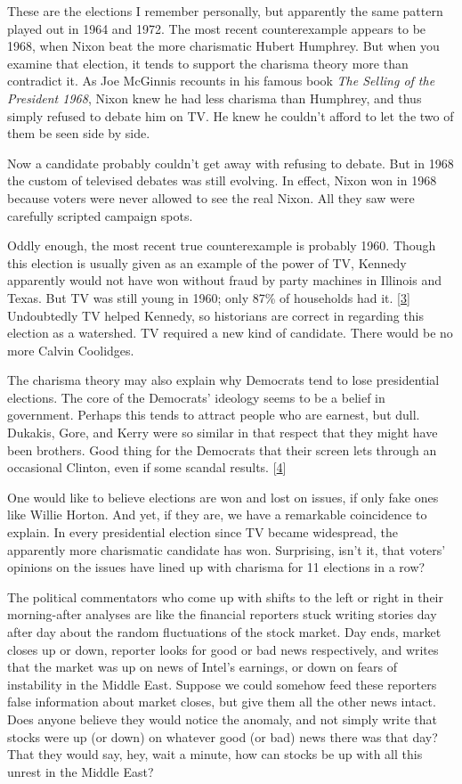 These are the elections I remember personally, but apparently the same
pattern played out in 1964 and 1972. The most recent counterexample
appears to be 1968, when Nixon beat the more charismatic Hubert
Humphrey. But when you examine that election, it tends to support the
charisma theory more than contradict it. As Joe McGinnis recounts in his
famous book \emph{The Selling of the President 1968}, Nixon knew he had
less charisma than Humphrey, and thus simply refused to debate him on
TV. He knew he couldn't afford to let the two of them be seen side by
side.

Now a candidate probably couldn't get away with refusing to debate. But
in 1968 the custom of televised debates was still evolving. In effect,
Nixon won in 1968 because voters were never allowed to see the real
Nixon. All they saw were carefully scripted campaign spots.

Oddly enough, the most recent true counterexample is probably 1960.
Though this election is usually given as an example of the power of TV,
Kennedy apparently would not have won without fraud by party machines in
Illinois and Texas. But TV was still young in 1960; only 87\% of
households had it. {[}\hyperref[f3n]{3}{]} Undoubtedly TV helped
Kennedy, so historians are correct in regarding this election as a
watershed. TV required a new kind of candidate. There would be no more
Calvin Coolidges.

The charisma theory may also explain why Democrats tend to lose
presidential elections. The core of the Democrats' ideology seems to be
a belief in government. Perhaps this tends to attract people who are
earnest, but dull. Dukakis, Gore, and Kerry were so similar in that
respect that they might have been brothers. Good thing for the Democrats
that their screen lets through an occasional Clinton, even if some
scandal results. {[}\hyperref[f4n]{4}{]}

One would like to believe elections are won and lost on issues, if only
fake ones like Willie Horton. And yet, if they are, we have a remarkable
coincidence to explain. In every presidential election since TV became
widespread, the apparently more charismatic candidate has won.
Surprising, isn't it, that voters' opinions on the issues have lined up
with charisma for 11 elections in a row?

The political commentators who come up with shifts to the left or right
in their morning-after analyses are like the financial reporters stuck
writing stories day after day about the random fluctuations of the stock
market. Day ends, market closes up or down, reporter looks for good or
bad news respectively, and writes that the market was up on news of
Intel's earnings, or down on fears of instability in the Middle East.
Suppose we could somehow feed these reporters false information about
market closes, but give them all the other news intact. Does anyone
believe they would notice the anomaly, and not simply write that stocks
were up (or down) on whatever good (or bad) news there was that day?
That they would say, hey, wait a minute, how can stocks be up with all
this unrest in the Middle East?

